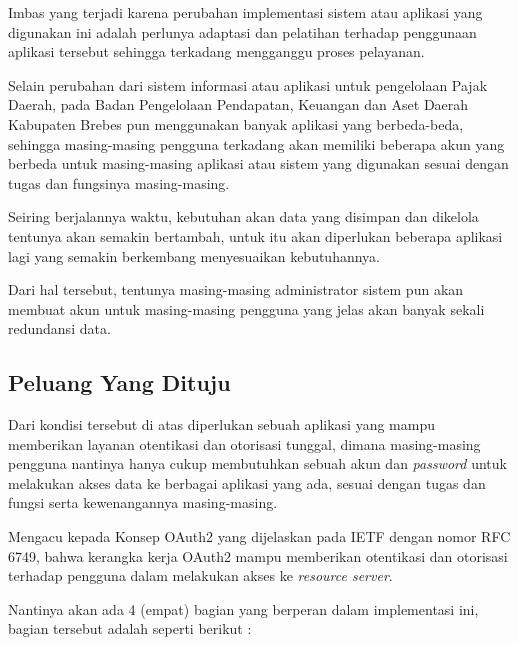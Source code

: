 \documentclass[pdftex,12pt, oneside]{article}
\begin{document}
Imbas yang terjadi karena perubahan implementasi sistem atau aplikasi yang digunakan ini adalah perlunya adaptasi dan pelatihan terhadap penggunaan aplikasi tersebut sehingga terkadang mengganggu proses pelayanan.

Selain perubahan dari sistem informasi atau aplikasi untuk pengelolaan Pajak Daerah, pada Badan Pengelolaan Pendapatan, Keuangan dan Aset Daerah Kabupaten Brebes pun menggunakan banyak aplikasi yang berbeda-beda, sehingga masing-masing pengguna terkadang akan memiliki beberapa akun yang berbeda untuk masing-masing aplikasi atau sistem yang digunakan sesuai dengan tugas dan fungsinya masing-masing.

Seiring berjalannya waktu, kebutuhan akan data yang disimpan dan dikelola tentunya akan semakin bertambah, untuk itu akan diperlukan beberapa aplikasi lagi yang semakin berkembang menyesuaikan kebutuhannya.

Dari hal tersebut, tentunya masing-masing administrator sistem pun akan membuat akun untuk masing-masing pengguna yang jelas akan banyak sekali redundansi data.

\subsection{Peluang Yang Dituju}

Dari kondisi tersebut di atas diperlukan sebuah aplikasi yang mampu memberikan layanan otentikasi dan otorisasi tunggal, dimana masing-masing pengguna nantinya hanya cukup membutuhkan sebuah akun dan \textit{password} untuk melakukan akses data ke berbagai aplikasi yang ada, sesuai dengan tugas dan fungsi serta kewenangannya masing-masing.

Mengacu kepada Konsep OAuth2 yang dijelaskan pada IETF dengan nomor RFC 6749, bahwa kerangka kerja OAuth2 mampu memberikan otentikasi dan otorisasi terhadap pengguna dalam melakukan akses ke \textit{resource server}.

Nantinya akan ada 4 (empat) bagian yang berperan dalam implementasi ini, bagian tersebut adalah seperti berikut :
\end{document}
